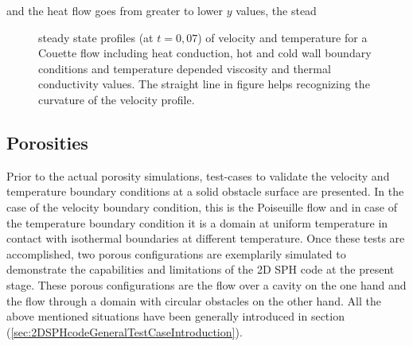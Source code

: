 \documentclass{report}
\begin{document}
and the heat flow goes from greater to lower $y$ values, the stead
\begin{figure}
 \centering
\label{fig:CompCouette_UT}
\caption[steady State profiles compressible Couette]{steady state profiles (at $t=0,07$) of velocity and temperature for a Couette flow including heat conduction, hot and cold wall boundary conditions and temperature depended viscosity and thermal conductivity values. The straight line in figure  helps recognizing the curvature of the velocity profile.}
\end{figure}

\subsection{Porosities}
Prior to the actual porosity simulations, test-cases to validate the velocity and temperature boundary conditions at a solid obstacle surface are presented. In the case of the velocity boundary condition, this is the Poiseuille flow and in case of the temperature boundary condition it is a domain at uniform temperature in contact with isothermal boundaries at different temperature. Once these tests are accomplished, two porous configurations are exemplarily simulated to demonstrate the capabilities and limitations of the 2D SPH code at the present stage. These porous configurations are the flow over a cavity on the one hand and the flow through a domain with circular obstacles on the other hand. All the above mentioned situations have been generally introduced in section (\ref{sec:2DSPHcodeGeneralTestCaseIntroduction}). 
\end{document}
